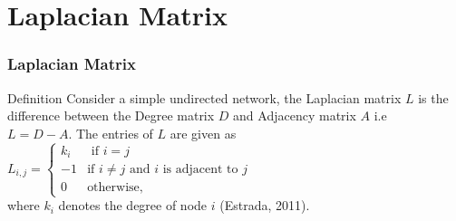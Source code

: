 \documentclass[10pt]{beamer}
\begin{document}
\section{Laplacian Matrix}
\begin{frame}
	\frametitle{Laplacian Matrix}
	\begin{block}{Definition}
		Consider a simple undirected network, the Laplacian matrix $L$ is the difference between the Degree matrix $D$ and Adjacency matrix $A$ i.e\\
		$L= D-A$. The entries of $L$ are given as\\
		\vspace{0.5 cm}
		$
		L_{i,j} = \begin{cases}
		k_i & \text{ if }  i=j\\
		-1  & \text{if } i \neq j \text{ and } i \text{ is adjacent to } j \\
		0 & \text{otherwise},
		\end{cases}
		$\\
		where $k_i$ denotes the degree of node $i$ (Estrada, 2011).
	\end{block}
\end{frame}
\end{document}
